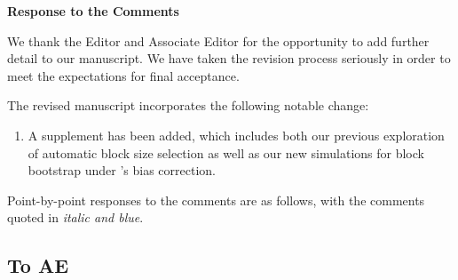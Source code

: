 \documentclass[12pt]{article}
\begin{document}
\begin{center}
  {\Large\bf Response to the Comments}
\end{center}


We thank the Editor and Associate Editor for the opportunity to add further detail to our manuscript.
We have taken the revision process seriously in order
to meet the expectations for final acceptance.


The revised manuscript incorporates the following notable change:
\begin{enumerate}
\item A supplement has been added, which includes both
our previous exploration of automatic block size selection as
well as our new simulations for block bootstrap under
\citet{babu2004goodness}'s bias correction.
\end{enumerate}


Point-by-point responses to the comments are as follows, with the
comments quoted in \emph{\color{darkblue} italic and blue}.


\subsection*{To AE}
\end{document}
